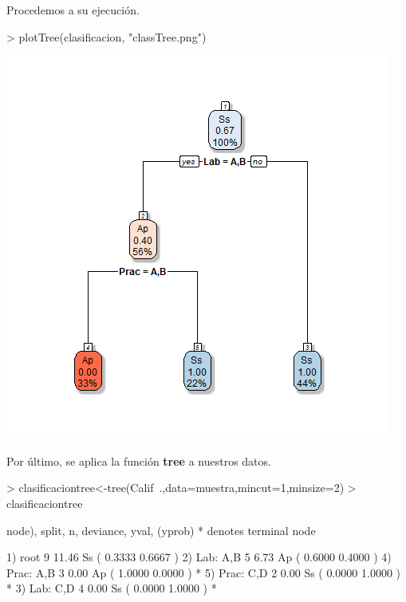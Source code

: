 \documentclass [a4paper] {article}
\begin{document}
\bigskip
Procedemos a su ejecución.
\begin{Schunk}
\begin{Sinput}
> plotTree(clasificacion, "classTree.png")
\end{Sinput}
\end{Schunk}
\includegraphics[width=\textwidth]{classTree}

\bigskip
Por último, se aplica la función \textbf{tree} a nuestros datos.
\begin{Schunk}
\begin{Sinput}
> clasificaciontree<-tree(Calif~.,data=muestra,mincut=1,minsize=2)
> clasificaciontree
\end{Sinput}
\begin{Soutput}
node), split, n, deviance, yval, (yprob)
      * denotes terminal node

1) root 9 11.46 Ss ( 0.3333 0.6667 )  
  2) Lab: A,B 5  6.73 Ap ( 0.6000 0.4000 )  
    4) Prac: A,B 3  0.00 Ap ( 1.0000 0.0000 ) *
    5) Prac: C,D 2  0.00 Ss ( 0.0000 1.0000 ) *
  3) Lab: C,D 4  0.00 Ss ( 0.0000 1.0000 ) *
\end{Soutput}
\end{Schunk}

\end{document}
